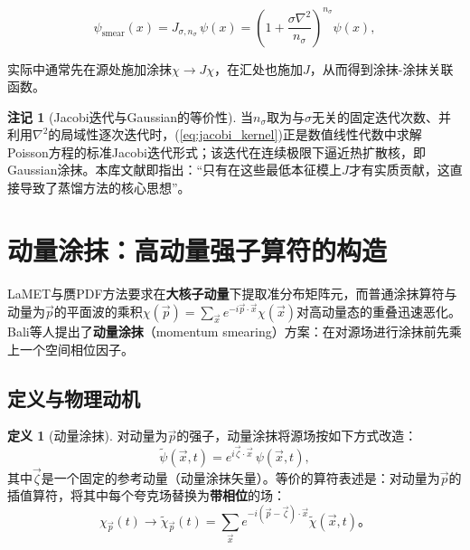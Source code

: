 \documentclass[12pt,a4paper]{ctexart}
\theoremstyle{definition}
\newtheorem{definition}{定义}[section]
\newtheorem{remark}{注记}[section]
\begin{document}
\begin{equation}
\psi_{\text{smear}}(x) = J_{\sigma,n_\sigma}\, \psi(x) = \left(1 + \frac{\sigma\nabla^2}{n_\sigma}\right)^{n_\sigma} \psi(x),
\label{eq:smeared_source}
\end{equation}

实际中通常先在源处施加涂抹$\chi \to J\chi$，在汇处也施加$J$，从而得到涂抹-涂抹关联函数。

\begin{remark}[Jacobi迭代与Gaussian的等价性]
\label{rem:jacobi_gaussian}
当$n_\sigma$取为与$\sigma$无关的固定迭代次数、并利用$\nabla^2$的局域性逐次迭代时，(\ref{eq:jacobi_kernel})正是数值线性代数中求解Poisson方程的标准Jacobi迭代形式；该迭代在连续极限下逼近热扩散核，即Gaussian涂抹\cite{UKQCD1993}。本库文献\cite{NoteGluonPDFs}即指出：``只有在这些最低本征模上$J$才有实质贡献，这直接导致了蒸馏方法的核心思想''。
\end{remark}

\section{动量涂抹：高动量强子算符的构造}

LaMET与赝PDF方法要求在\textbf{大核子动量}下提取准分布矩阵元，而普通涂抹算符与动量为$\vec{p}$的平面波的乘积$\chi(\vec{p}) = \sum_{\vec{x}} e^{-i\vec{p}\cdot\vec{x}} \chi(\vec{x})$对高动量态的重叠迅速恶化。Bali等人提出了\textbf{动量涂抹}（momentum smearing）方案\cite{Bali2016}：在对源场进行涂抹前先乘上一个空间相位因子。

\subsection{定义与物理动机}

\begin{definition}[动量涂抹]
对动量为$\vec{p}$的强子，动量涂抹将源场按如下方式改造\cite{Bali2016,Egerer2021a}：
\begin{equation}
\boxed{\tilde\psi(\vec{x}, t) = e^{i\vec{\zeta}\cdot\vec{x}}\, \psi(\vec{x}, t)},
\label{eq:mom_smear_phase}
\end{equation}
其中$\vec{\zeta}$是一个固定的参考动量（动量涂抹矢量）。等价的算符表述是：对动量为$\vec{p}$的插值算符，将其中每个夸克场替换为\textbf{带相位}的场：
\begin{equation}
\chi_{\vec{p}}(t) \to \tilde\chi_{\vec{p}}(t) = \sum_{\vec{x}} e^{-i(\vec{p} - \vec{\zeta})\cdot\vec{x}} \tilde\chi(\vec{x}, t)。
\label{eq:boosted_operator}
\end{equation}
\end{definition}
\end{document}
